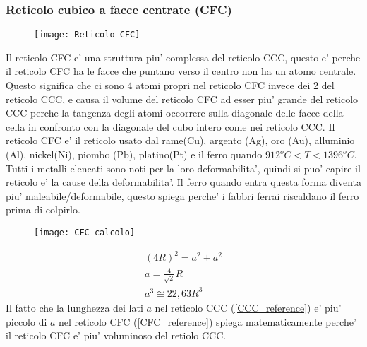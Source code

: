 \documentclass{article}
\begin{document}
            \subsubsection{Reticolo cubico a facce centrate (CFC)}
                \begin{figure}[h!]
                    \centering
                    \texttt{[image: Reticolo CFC]}
                \end{figure}
                Il reticolo CFC e' una struttura piu' complessa del reticolo CCC, questo e' perche il reticolo CFC ha le facce che puntano verso il centro non ha un atomo centrale.
                Questo significa che ci sono 4 atomi propri nel reticolo CFC invece dei 2 del reticolo CCC, e causa il volume del reticolo CFC ad esser piu' grande del reticolo CCC perche 
                la tangenza degli atomi occorrere sulla diagonale delle facce della cella in confronto con la diagonale del cubo intero come nei reticolo CCC.
                \newline \newline Il reticolo CFC e' il reticolo usato dal rame(Cu), argento (Ag), oro (Au), alluminio (Al), nickel(Ni), piombo (Pb), platino(Pt) e 
                il ferro quando $912^o C<T<1396^o C$.
                \newline \newline Tutti i metalli elencati sono noti per la loro deformabilita', quindi si puo' capire il reticolo e' la cause della deformabilita'.
                \newline \newline Il ferro quando entra questa forma diventa piu' maleabile/deformabile, questo spiega perche' i fabbri ferrai riscaldano il ferro 
                prima di colpirlo.
                \begin{figure}[h!]
                    \centering
                    \texttt{[image: CFC calcolo]}
                \end{figure}
                \begin{gather}
                    (4R)^2 = a^2 + a^2 \\
                    a = \frac{4}{\sqrt{2}} R \label{CFC_reference}\\
                    a^3 \cong 22,63 R^3
                \end{gather}
                Il fatto che la lunghezza dei lati $a$ nel reticolo CCC (\ref{CCC_reference}) e' piu' piccolo di $a$ nel reticolo CFC 
                (\ref{CFC_reference}) spiega matematicamente perche' il reticolo CFC e' piu' voluminoso del retiolo CCC.
\end{document}
